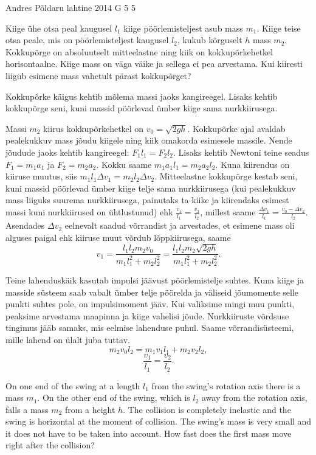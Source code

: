 {Andres Põldaru} %
{lahtine} %
{2014} %
{G 5} %
{5} %
{
\ifStatement
Kiige ühe otsa peal kaugusel $l_1$ kiige pöörlemisteljest asub mass $m_1$. Kiige teise otsa peale, mis on pöörlemisteljest kaugusel $l_2$, kukub kõrguselt $h$ mass $m_2$. Kokkupõrge on absoluutselt mitteelastne ning kiik on kokkupõrkehetkel horisontaalne. Kiige mass on väga väike ja sellega ei pea arvestama. Kui kiiresti liigub esimene mass vahetult pärast kokkupõrget?
\fi


\ifHint
Kokkupõrke käigus kehtib mõlema massi jaoks kangireegel. Lisaks kehtib kokkupõrge seni, kuni massid pöörlevad ümber kiige sama nurkkiirusega.
\fi


\ifSolution
Massi $m_2$ kiirus kokkupõrkehetkel on $v_0=\sqrt{2gh}$. Kokkupõrke ajal avaldab pealekukkuv mass jõudu kiigele ning kiik omakorda esimesele massile. Nende jõudude jaoks kehtib kangireegel: $F_1l_1=F_2l_2$. Lisaks kehtib Newtoni teine seadus $F_1=m_1a_1$ ja $F_2=m_2a_2$. Kokku saame $m_1a_1l_1=m_2a_2l_2$. Kuna kiirendus on kiiruse muutus, siis $m_1l_1\Delta v_1=m_2l_2\Delta v_2$. Mitteelastne kokkupõrge kestab seni, kuni massid pöörlevad ümber kiige telje sama nurkkiirusega (kui pealekukkuv mass liiguks suurema nurkkiirusega, painutaks ta kiike ja kiirendaks esimest massi kuni nurkkiirused on ühtlustunud) ehk $\frac{v_1}{l_1}=\frac{v_2}{l_2}$, millest saame $\frac{\Delta v_1}{l_1}=\frac{v_0-\Delta v_2}{l_2}$. Asendades $\Delta v_2$ eelnevalt saadud võrrandist ja arvestades, et esimene mass oli alguses paigal ehk kiiruse muut võrdub lõppkiirusega, saame 
\[
v_1=\frac{l_1l_2m_2v_0}{m_1l_1^2+m_2l_2^2}=\frac{l_1l_2m_2\sqrt{2gh}}{m_1l_1^2+m_2l_2^2}.
\]

Teine lahenduskäik kasutab impulsi jäävust pöörlemistelje suhtes. Kuna kiige ja masside süsteem saab vabalt ümber telje pöörelda ja väliseid jõumomente selle punkti suhtes pole, on impulsimoment jääv. Kui valiksime mingi muu punkti, peaksime arvestama maapinna ja kiige vahelisi jõude. Nurkkiiruste võrdsuse tingimus jääb samaks, mis eelmise lahenduse puhul. Saame võrrandisüsteemi, mille lahend on ülalt juba tuttav.
\[
 m_2v_0l_2=m_1v_1l_1+m_2v_2l_2,
\]
\[
\frac{v_1}{l_1}=\frac{v_2}{l_2}.
\]
\fi


\ifEngStatement
On one end of the swing at a length $l_1$ from the swing’s rotation axis there is a mass $m_1$. On the other end of the swing, which is $l_2$ away from the rotation axis, falls a mass $m_2$ from a height $h$. The collision is completely inelastic and the swing is horizontal at the moment of collision. The swing’s mass is very small and it does not have to be taken into account. How fast does the first mass move right after the collision?
\fi


}
